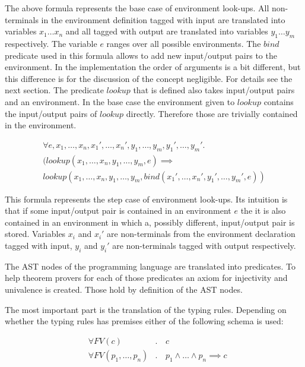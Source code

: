 The above formula represents the base case of environment
look-ups. All non-terminals in the environment definition tagged with
input are translated into variables $x_1 \dots x_n$ and all tagged
with output are translated into variables $y_1 \dots y_m$
respectively. The variable $e$ ranges over all possible
environments. The $bind$ predicate used in this formula allows to add
new input/output pairs to the environment. In the implementation the
order of arguments is a bit different, but this difference is for the
discussion of the concept negligible. For details see the next
section. The predicate $lookup$ that is defined
also takes input/output pairs and an environment. In the base case the
environment given to $lookup$ contains the input/output pairs of
$lookup$ directly. Therefore those are trivially contained in the
environment.

\begin{multline}
  \forall e, x_1, \dots, x_n, x_1', \dots, x_n', y_1, \dots, y_m, y_1', \dots,
  y_m' . \\
  (lookup(x_1, \dots, x_n, y_1, \dots, y_m, e) \implies \\ lookup(x_1,
  \dots, x_n, y_1, \dots, y_m, bind(x_1',\dots,x_n',y_1',\dots,y_m',e))
\end{multline}

This formula represents the step case of environment look-ups. Its
intuition is that if some input/output pair is contained in an
environment $e$ the it is also contained in an environment in which a,
possibly different, input/output pair is stored. Variables $x_i$ and
$x_i'$ are non-terminals from the environment declaration tagged with
input, $y_i$ and $y_i'$ are non-terminals tagged with output
respectively.

The AST nodes of the programming language are translated into
predicates. To help theorem provers for each of those predicates an
axiom for injectivity and univalence is created. Those hold by
definition of the AST nodes.

The most important part is the translation of the typing
rules. Depending on whether the typing rules has premises either of
the following schema is used:

\begin{align}
  &\forall FV(c) &.\,& c \\
  &\forall FV(p_1,\dots, p_n) &.\,& p_1 \land \dots \land p_n \implies c
\end{align}

